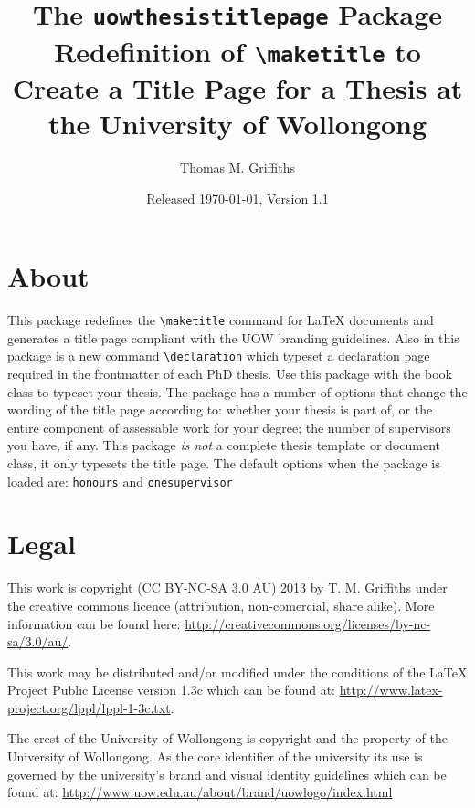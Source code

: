 \documentclass[12pt,oneside]{article}
\newcommand{\oporcom}[1]{\texttt{\color{RoyalBlue}#1}} %
\begin{document}
    
\title{\textsf{The \texttt{uowthesistitlepage} Package\\
Redefinition of \texttt{\textbackslash{}maketitle} to Create a Title Page for a Thesis at the University of Wollongong}}
\author{Thomas M. Griffiths}
\date{Released \today, Version 1.1}

\maketitle

\tableofcontents

\section{About}
This package redefines the \oporcom{\textbackslash{}maketitle} command for LaTeX documents and generates a title page compliant with the UOW branding guidelines. Also in this package is a new command \oporcom{\textbackslash{}declaration} which typeset a declaration page required in the frontmatter of each PhD thesis. Use this package with the book class to typeset your thesis. The package has a number of options that change the wording of the title page according to: whether your thesis is part of, or the entire component of assessable work for your degree; the number of supervisors you have, if any. This package \emph{is not} a complete thesis template or document class, it only typesets the title page. The default options when the package is loaded are: \oporcom{honours} and \oporcom{onesupervisor}

\section{Legal}
This work is copyright (CC BY-NC-SA 3.0 AU) 2013 by T. M. Griffiths under the creative commons licence (attribution, non-comercial, share alike). More information can be found here: \url{http://creativecommons.org/licenses/by-nc-sa/3.0/au/}. 

This work may be distributed and/or modified under the conditions of the LaTeX Project Public License version 1.3c which can be found at: \url{http://www.latex-project.org/lppl/lppl-1-3c.txt}.

The crest of the University of Wollongong is copyright and the property of the University of Wollongong. As the core identifier of the university its use is governed by the university's brand and visual identity guidelines which can be found at: \url{http://www.uow.edu.au/about/brand/uowlogo/index.html}
\end{document}
